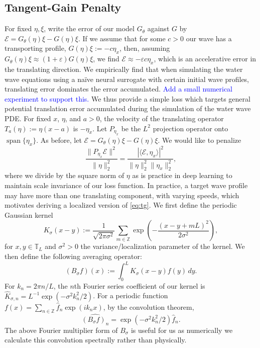 \documentclass{article}
\begin{document}
\subsection{Tangent-Gain Penalty}
For fixed $\eta,\xi$, write the error of our model $G_\theta$ against $G$ by
$\mathcal E=G_\theta(\eta)\xi-G(\eta)\xi$. If we assume that for some
$c>0$ our wave has a transporting profile, $G(\eta)\xi:=-c\eta_x$, then,
assuming $G_\theta(\eta)\xi\approx(1+\varepsilon)G(\eta)\xi$, we find
$\mathcal E\approx-\varepsilon c\eta_x$, which is an accelerative error in
the translating direction. We empirically find that when simulating the
water wave equations using a na\"ive neural surrogate with certain initial
wave profiles, translating error dominates the error accumulated.
\textcolor{blue}{Add a small numerical experiment to support this.}
We thus provide a simple loss which targets general potential translation
error accumulated during the simulation of the water wave PDE.
For fixed $x$, $\eta$, and $a>0$, the velocity of the translating operator
$T_a(\eta):=\eta(x-a)$ is $-\eta_x$. Let $P_{\eta_x}$ be the $L^2$
projection operator onto $\operatorname{span}\{\eta_x\}$. As before, let
$\mathcal E=G_\theta(\eta)\xi-G(\eta)\xi$. We would like to penalize
\begin{equation}
    \frac{\|P_{\eta_x}\mathcal E\|^2}{\|\eta\|_2^2}
    =\frac{|\langle\mathcal E,\eta_x\rangle|^2}
       {\|\eta\|_2^2\|\eta_x\|_2^2},
    \label{eq:tg}
\end{equation}
where we divide by the square norm of $\eta$ as is practice in deep learning
to maintain scale invariance of our loss function.
In practice, a target wave profile may have more than one translating
component, with varying speeds, which motivates deriving a localized version
of \eqref{eq:tg}. We first define the periodic Gaussian kernel
\[
K_\sigma(x-y):=\frac1{\sqrt{2\pi\sigma^2}}
\sum_{m\in\mathbb Z}\exp\left(-\frac{(x-y+mL)^2}{2\sigma^2}\right),
\]
for $x,y\in\mathbb T_L$ and $\sigma^2>0$ the variance/localization parameter
of the kernel. We then define the following averaging operator:
\[
    (B_\sigma f)(x):=\int_0^L K_\sigma(x-y)f(y)\,dy.
\]
For $k_n=2\pi n/L$, the $n$th Fourier series coefficient of our kernel is
$\widehat K_{\sigma,n}=L^{-1}\exp(-\sigma^2k_n^2/2)$. For a periodic
function $f(x)=\sum_{n\in\mathbb Z}\widehat f_n\exp(ik_nx)$, by the
convolution theorem,
\[
    \widehat{(B_\sigma f)_n}=\exp(-\sigma^2k_n^2/2)\widehat f_n.
\]
The above Fourier multiplier form of $B_\sigma$ is useful for us as
numerically we calculate this convolution spectrally rather than physically.
\end{document}
